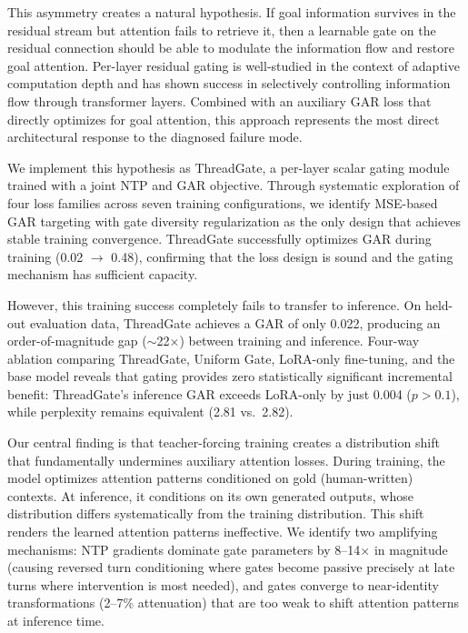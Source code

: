 \documentclass[11pt,a4paper]{article}
\begin{document}
This asymmetry creates a natural hypothesis. If goal information survives in the residual stream but attention fails to retrieve it, then a learnable gate on the residual connection should be able to modulate the information flow and restore goal attention. Per-layer residual gating is well-studied in the context of adaptive computation depth \cite{wang2022skipnet,raposo2024mixture} and has shown success in selectively controlling information flow through transformer layers. Combined with an auxiliary GAR loss that directly optimizes for goal attention, this approach represents the most direct architectural response to the diagnosed failure mode.

We implement this hypothesis as ThreadGate, a per-layer scalar gating module trained with a joint NTP and GAR objective. Through systematic exploration of four loss families across seven training configurations, we identify MSE-based GAR targeting with gate diversity regularization as the only design that achieves stable training convergence. ThreadGate successfully optimizes GAR during training (0.02 $\to$ 0.48), confirming that the loss design is sound and the gating mechanism has sufficient capacity.

However, this training success completely fails to transfer to inference. On held-out evaluation data, ThreadGate achieves a GAR of only 0.022, producing an order-of-magnitude gap ($\sim$22$\times$) between training and inference. Four-way ablation comparing ThreadGate, Uniform Gate, LoRA-only fine-tuning, and the base model reveals that gating provides zero statistically significant incremental benefit: ThreadGate's inference GAR exceeds LoRA-only by just 0.004 ($p > 0.1$), while perplexity remains equivalent (2.81 vs.\ 2.82).

Our central finding is that teacher-forcing training creates a distribution shift that fundamentally undermines auxiliary attention losses. During training, the model optimizes attention patterns conditioned on gold (human-written) contexts. At inference, it conditions on its own generated outputs, whose distribution differs systematically from the training distribution. This shift renders the learned attention patterns ineffective. We identify two amplifying mechanisms: NTP gradients dominate gate parameters by 8--14$\times$ in magnitude (causing reversed turn conditioning where gates become passive precisely at late turns where intervention is most needed), and gates converge to near-identity transformations (2--7\% attenuation) that are too weak to shift attention patterns at inference time.
\end{document}
